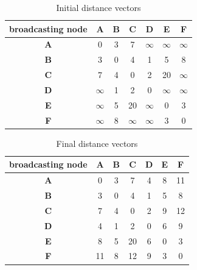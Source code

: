 \documentclass{article}
\begin{document}
\begin{table}[h!]
    \begin{center}
        \caption{Initial distance vectors}
        \label{tab:initial-vector}
        \begin{tabular}{c|c|c|c|c|c|c} %
        \toprule
        \textbf{broadcasting node}& \textbf{A}&\textbf{B}&\textbf{C}&\textbf{D}&\textbf{E}&\textbf{F}\\
        \hline
        \textbf{A}&0&3&7&$\infty$&$\infty$&$\infty$\\
        \hline
        \textbf{B}&3&0&4&1&5&8\\
        \hline
        \textbf{C}&7&4&0&2&20&$\infty$\\
        \hline
        \textbf{D}&$\infty$&1&2&0&$\infty$&$\infty$\\
        \hline
        \textbf{E}&$\infty$&5&20&$\infty$&0&3\\
        \hline
        \textbf{F}&$\infty$&8&$\infty$&$\infty$&3&0\\
        \bottomrule
        \end{tabular}
    \end{center}
\end{table}

\begin{table}[h!]
    \begin{center}
        \caption{Final distance vectors}
        \label{tab:final-vector}
        \begin{tabular}{c|c|c|c|c|c|c} %
        \toprule
        \textbf{broadcasting node}& \textbf{A}&\textbf{B}&\textbf{C}&\textbf{D}&\textbf{E}&\textbf{F}\\
        \hline
        \textbf{A}&0&3&7&4&8&11\\
        \hline
        \textbf{B}&3&0&4&1&5&8\\
        \hline
        \textbf{C}&7&4&0&2&9&12\\
        \hline
        \textbf{D}&4&1&2&0&6&9\\
        \hline
        \textbf{E}&8&5&20&6&0&3\\
        \hline
        \textbf{F}&11&8&12&9&3&0\\
        \bottomrule
        \end{tabular}
    \end{center}
\end{table}
\end{document}
